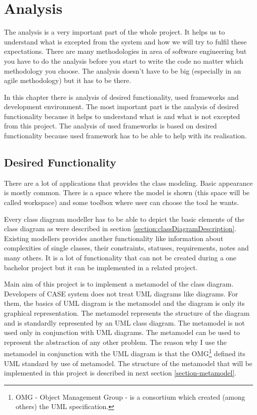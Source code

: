 \chapter{Analysis}

The analysis is a very important part of the whole project. It helps us to understand what is excepted from the system and how we will try to fulfil these expectations. There are many methodologies in area of software engineering but you have to do the analysis before you start to write the code no matter which methodology you choose. The analysis doesn't have to be big (especially in an agile methodology) but it has to be there.

In this chapter there is analysis of desired functionality, used frameworks and development environment. The most important part is the analysis of desired functionality because it helps to understand what is and what is not excepted from this project. The analysis of used frameworks is based on desired functionality because used framework has to be able to help with its realisation.

\section{Desired Functionality}

There are a lot of applications that provides the class modeling. Basic appearance is mostly common. There is a space where the model is shown (this space will be called workspace) and some toolbox where user can choose the tool he wants.

Every class diagram modeller has to be able to depict the basic elements of the class diagram as were described in section \ref{section:classDiagramDescription}. Existing modellers provides another functionality like information about complexities of single classes, their constraints, statuses, requirements, notes and many others. It is a lot of functionality that can not be created during a one bachelor project but it can be implemented in a related project.

Main aim of this project is to implement a metamodel of the class diagram. Developers of CASE system does not treat UML diagrams like diagrams. For them, the basics of UML diagram is the metamodel and the diagram is only its graphical representation. The metamodel represents the structure of the diagram and is standardly represented by an UML class diagram. The metamodel is not used only in conjunction with UML diagrams. The metamodel can be used to represent the abstraction of any other problem. The reason why I use the metamodel in conjunction with the UML diagram is that the OMG\footnote{OMG - Object Management Group - is a consortium which created (among others) the UML specification.} defined its UML standard by use of metamodel. The structure of the metamodel that will be implemented in this project is described in next section \ref{section-metamodel}.

